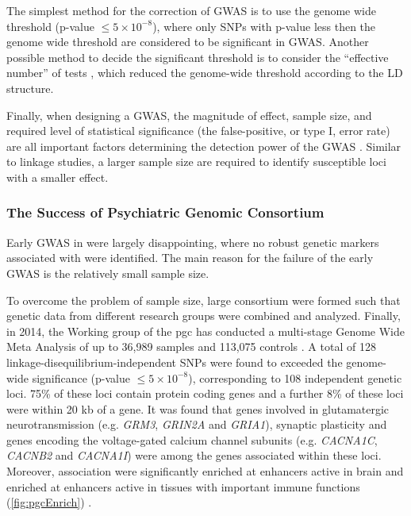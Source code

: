 	The simplest method for the correction of \gls{GWAS} is to use the genome wide threshold (p-value $\le5\times10^{-8}$), where only \glspl{SNP} with p-value less then the genome wide threshold are considered to be significant in \gls{GWAS}.
	Another possible method to decide the significant threshold is to consider the ``effective number'' of tests \citep{Li2011}, which reduced the genome-wide threshold according to the \gls{LD} structure.
	
	Finally, when designing a \gls{GWAS}, the magnitude of effect, sample size, and required level of statistical significance (the false-positive, or type I, error rate) are all important factors determining the detection power of the \gls{GWAS} \citep{Purcell2003}.
	Similar to linkage studies, a larger sample size are required to identify susceptible loci with a smaller effect. 
	
	\subsubsection{The Success of Psychiatric Genomic Consortium} 
	Early \gls{GWAS} in  were largely disappointing, where no robust genetic markers associated with  were identified. 
	The main reason for the failure of the early \gls{GWAS} is the relatively small sample size.
	
	To overcome the problem of sample size, large consortium were formed such that genetic data from different research groups were combined and analyzed.
	Finally, in 2014, the  Working group of the \gls{pgc} has conducted a multi-stage  Genome Wide Meta Analysis of up to 36,989  samples and 113,075 controls \citep{Ripke2014}.
	A total of 128 linkage-disequilibrium-independent \glspl{SNP} were found to exceeded the genome-wide significance (p-value $\le 5\times10^{-8}$), corresponding to 108 independent genetic loci.
	75\% of these loci contain protein coding genes and a further 8\% of these loci were within 20 \gls{kb} of a gene. 
	It was found that genes involved in glutamatergic neurotransmission (e.g. \textit{GRM3}, \textit{GRIN2A} and \textit{GRIA1}), synaptic plasticity and genes encoding the voltage-gated calcium channel subunits (e.g. \textit{CACNA1C}, \textit{CACNB2} and \textit{CACNA1I}) were among the genes associated within these loci.
	Moreover,  association were significantly enriched at enhancers active in brain and enriched at enhancers active in tissues with important immune functions (\cref{fig:pgcEnrich}) \citep{Ripke2014}.
	

